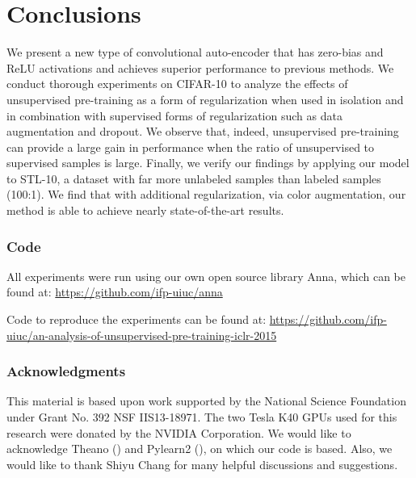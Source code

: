 \documentclass{article} \usepackage{iclr2015,times}
\begin{document}
\section{Conclusions}
\label{sec:conclusions}
We present a new type of convolutional auto-encoder that has zero-bias and ReLU activations and achieves superior performance to previous methods.
We conduct thorough experiments on CIFAR-10 to analyze the effects of unsupervised pre-training as a form of regularization when used in isolation and in combination with supervised forms of regularization such as data augmentation and dropout. We observe that, indeed, unsupervised pre-training can provide a large gain in performance when the ratio of unsupervised to supervised samples is large. 
Finally, we verify our findings by applying our model to STL-10, a dataset with far more unlabeled samples than labeled samples (100:1). We find that with additional regularization, via color augmentation, our method is able to achieve nearly state-of-the-art results. 
\subsubsection*{Code}
All experiments were run using our own open source library Anna, which can be found at: \url{https://github.com/ifp-uiuc/anna}

Code to reproduce the experiments can be found at: \url{https://github.com/ifp-uiuc/an-analysis-of-unsupervised-pre-training-iclr-2015}

\subsubsection*{Acknowledgments}
This material is based upon work supported by the National Science Foundation under Grant No. 392 NSF IIS13-18971. The two Tesla K40 GPUs used for this research were donated by the NVIDIA Corporation. We would like to acknowledge Theano (\citet{bergstra2010theano}) and Pylearn2 (\citet{goodfellow2013pylearn2}), on which our code is based. Also, we would like to thank Shiyu Chang for many helpful discussions and suggestions.



\end{document}

